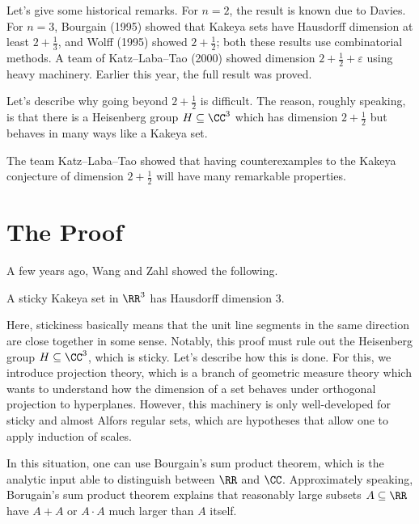 \documentclass{article}
\begin{document}
Let's give some historical remarks. For $n=2$, the result is known due to Davies. For $n=3$, Bourgain (1995) showed that Kakeya sets have Hausdorff dimension at least $2+\frac13$, and Wolff (1995) showed $2+\frac12$; both these results use combinatorial methods. A team of Katz--Laba--Tao (2000) showed dimension $2+\frac12+\varepsilon$ using heavy machinery. Earlier this year, the full result was proved.
\begin{remark}
	Let's describe why going beyond $2+\frac12$ is difficult. The reason, roughly speaking, is that there is a Heisenberg group $H\subseteq\CC^3$ which has dimension $2+\frac12$ but behaves in many ways like a Kakeya set.
\end{remark}
The team Katz--Laba--Tao showed that having counterexamples to the Kakeya conjecture of dimension $2+\frac12$ will have many remarkable properties.

\section{The Proof}
A few years ago, Wang and Zahl showed the following.
\begin{theorem}
	A sticky Kakeya set in $\RR^3$ has Hausdorff dimension $3$.
\end{theorem}
Here, stickiness basically means that the unit line segments in the same direction are close together in some sense. Notably, this proof must rule out the Heisenberg group $H\subseteq\CC^3$, which is sticky. Let's describe how this is done. For this, we introduce projection theory, which is a branch of geometric measure theory which wants to understand how the dimension of a set behaves under orthogonal projection to hyperplanes. However, this machinery is only well-developed for sticky and almost Alfors regular sets, which are hypotheses that allow one to apply induction of scales.

In this situation, one can use Bourgain's sum product theorem, which is the analytic input able to distinguish between $\RR$ and $\CC$. Approximately speaking, Borugain's sum product theorem explains that reasonably large subsets $A\subseteq\RR$ have $A+A$ or $A\cdot A$ much larger than $A$ itself.
\end{document}
